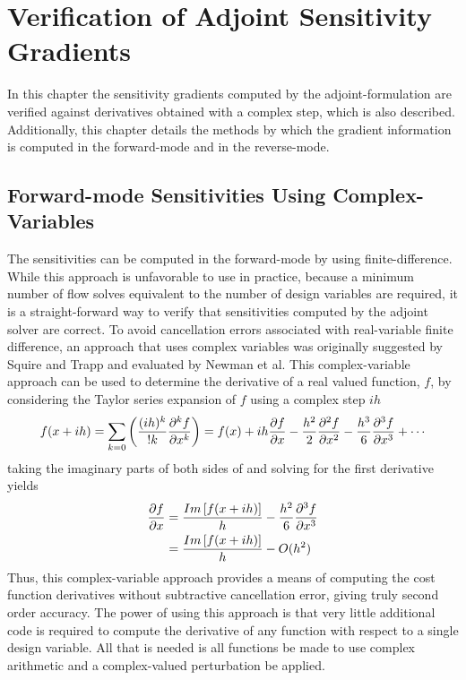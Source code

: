 \chapter{Verification of Adjoint Sensitivity Gradients}
\label{chapter-seven}

In this chapter the sensitivity gradients computed by the adjoint-formulation
are verified against derivatives obtained with a complex step, which is also
described.  Additionally, this chapter details the methods by which the gradient
information is computed in the forward-mode and in the reverse-mode.

\section{Forward-mode Sensitivities Using Complex-Variables}

The sensitivities can be computed in the forward-mode by using
finite-difference.  While this approach is unfavorable to use in practice,
because a minimum number of flow solves equivalent to the number of design
variables are required, it is a straight-forward way to verify that
sensitivities computed by the adjoint solver are correct.  To avoid cancellation
errors associated with real-variable finite difference, an approach that uses
complex variables was originally suggested by Squire and Trapp\cite{squire1998}
and evaluated by Newman et al\cite{newman1998}.  This complex-variable approach
can be used to determine the derivative of a real valued function, $f$, by
considering the Taylor series expansion of $f$ using a complex step $ih$
\begin{equation}
  f(x + ih) = \sum_{k=0}\left( \frac{(ih)^k}{!k}\pnd{f}{x}{k} \right)
            = f(x) + ih\pd{f}{x} - \frac{h^2}{2}\pnd{f}{x}{2}
            - \frac{h^3}{6}\pnd{f}{x}{3} + \cdots
  \label{taylor-exp}
\end{equation}
taking the imaginary parts of both sides of  and solving for
the first derivative yields
\begin{equation}
  \begin{aligned}
    \frac{\partial f}{\partial x} &= \frac{Im\left[ f(x + ih) \right]}{h} -
    \frac{h^2}{6}\frac{\partial^{3} f}{\partial x^{3}} \\
              &= \frac{Im\left[ f(x + ih) \right]}{h} - O(h^2)
  \end{aligned}
  \label{complex-fd}
\end{equation}
Thus, this complex-variable approach provides a means of computing the cost
function derivatives without subtractive cancellation error, giving truly second
order accuracy.  The power of using this approach is that very little additional
code is required to compute the derivative of any function with respect to a
single design variable.  All that is needed is all functions be made to use
complex arithmetic and a complex-valued perturbation be applied.

